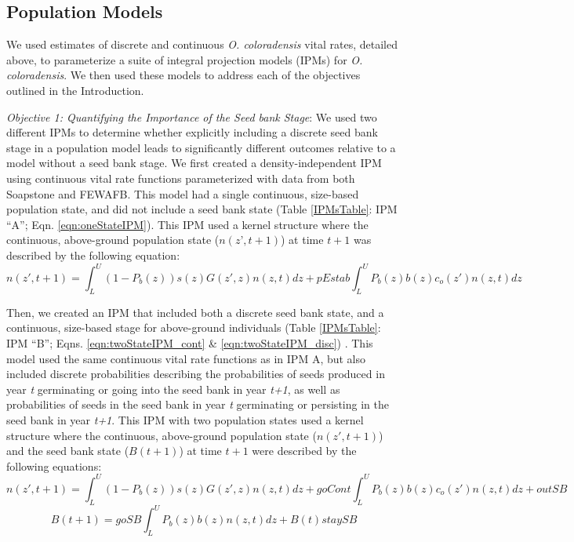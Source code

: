 \documentclass[12pt, letterpaper]{article}
\begin{document}
\subsection{Population Models}
We used estimates of discrete and continuous \textit{O. coloradensis} vital rates, detailed above, to parameterize a suite of integral projection models (IPMs) for \textit{O. coloradensis}. We then used these models to address each of the objectives outlined in the Introduction.

\textit{Objective 1: Quantifying the Importance of the Seed bank Stage}: We used two different IPMs to determine whether explicitly including a discrete seed bank stage in a population model leads to significantly different outcomes relative to a model without a seed bank stage. We first created a density-independent IPM using continuous vital rate functions parameterized with data from both Soapstone and FEWAFB. This model had a single continuous, size-based population state, and did not include a seed bank state (Table \ref{IPMsTable}: IPM “A”; Eqn. \ref{eqn:oneStateIPM}). This IPM used a kernel structure where the continuous, above-ground population state ($n(z’, t+1)$) at time $t+1$ was described by the following equation:  
\begin{equation}\label{eqn:oneStateIPM}
n(z', t+1) = \int_{L}^{U}(1-P_b(z))s(z)G(z',z)n(z,t)dz + pEstab\int_{L}^{U}P_b(z)b(z)c_o(z')n(z,t)dz
\end{equation}

Then, we created an IPM that included both a discrete seed bank state, and a continuous, size-based stage for above-ground individuals (Table \ref{IPMsTable}: IPM “B”; Eqns. \ref{eqn:twoStateIPM_cont} \& \ref{eqn:twoStateIPM_disc}) \cite{Ellner2006IntegralDemography, Rees2006, Paniw2017}. This model used the same continuous vital rate functions as in IPM A, but also included discrete probabilities describing the probabilities of seeds produced in year \textit{t} germinating or going into the seed bank in year \textit{t+1}, as well as probabilities of seeds in the seed bank in year \textit{t} germinating or persisting in the seed bank in year \textit{t+1}. This IPM with two population states used a kernel structure where the continuous, above-ground population state ($n(z',t+1)$) and the seed bank state ($B(t+1)$) at time $t+1$ were described by the following equations: 
\begin{equation}\label{eqn:twoStateIPM_cont}
n(z', t+1) = \int_{L}^{U}(1-P_b(z))s(z)G(z',z)n(z,t)dz + goCont\int_{L}^{U}P_b(z)b(z)c_o(z')n(z,t)dz + outSB 
\end{equation}
\begin{equation}\label{eqn:twoStateIPM_disc}
     B(t+1) = goSB\int_{L}^{U}P_b(z)b(z)n(z,t)dz + B(t)staySB 
\end{equation}
\end{document}
